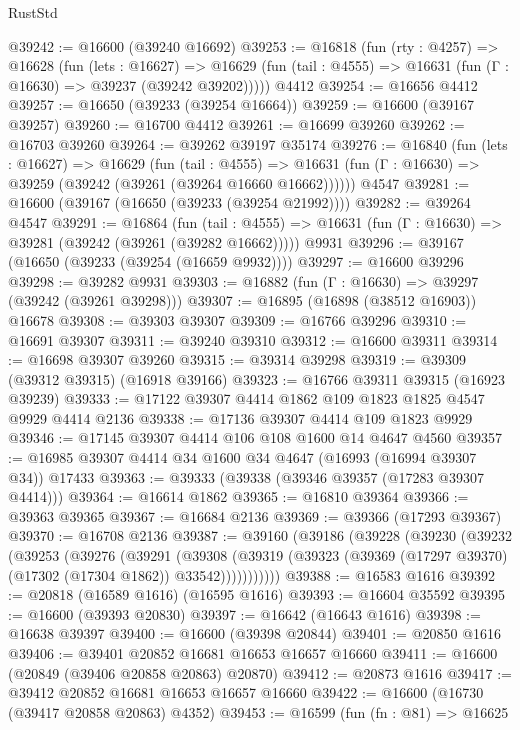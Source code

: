 \begin{lexlean}{RustStd}
\begin{coremodule}
{\begin{coremodule}
{{{{{{{{{{{{{{{{{{{{{{{{{{{{{{{{{{{{{{{{{{{{{{{{{{{{{{{@39242 := @16600 (@39240 @16692)
@39253 := @16818
    (fun (rty : @4257) =>
    @16628
      (fun (lets : @16627) =>
      @16629 (fun (tail : @4555) => @16631 (fun (Γ : @16630) => @39237 (@39242 @39202)))))
    @4412
@39254 := @16656 @4412
@39257 := @16650 (@39233 (@39254 @16664))
@39259 := @16600 (@39167 @39257)
@39260 := @16700 @4412
@39261 := @16699 @39260
@39262 := @16703 @39260
@39264 := @39262 @39197 @35174
@39276 := @16840
    (fun (lets : @16627) =>
    @16629
      (fun (tail : @4555) =>
      @16631 (fun (Γ : @16630) => @39259 (@39242 (@39261 (@39264 @16660 @16662))))))
    @4547
@39281 := @16600 (@39167 (@16650 (@39233 (@39254 @21992))))
@39282 := @39264 @4547
@39291 := @16864
    (fun (tail : @4555) => @16631 (fun (Γ : @16630) => @39281 (@39242 (@39261 (@39282 @16662)))))
    @9931
@39296 := @39167 (@16650 (@39233 (@39254 (@16659 @9932))))
@39297 := @16600 @39296
@39298 := @39282 @9931
@39303 := @16882 (fun (Γ : @16630) => @39297 (@39242 (@39261 @39298)))
@39307 := @16895 (@16898 (@38512 @16903)) @16678
@39308 := @39303 @39307
@39309 := @16766 @39296
@39310 := @16691 @39307
@39311 := @39240 @39310
@39312 := @16600 @39311
@39314 := @16698 @39307 @39260
@39315 := @39314 @39298
@39319 := @39309 (@39312 @39315) (@16918 @39166)
@39323 := @16766 @39311 @39315 (@16923 @39239)
@39333 := @17122 @39307 @4414 @1862 @109 @1823 @1825 @4547 @9929 @4414 @2136
@39338 := @17136 @39307 @4414 @109 @1823 @9929
@39346 := @17145 @39307 @4414 @106 @108 @1600 @14 @4647 @4560
@39357 := @16985 @39307 @4414 @34 @1600 @34 @4647 (@16993 (@16994 @39307 @34)) @17433
@39363 := @39333 (@39338 (@39346 @39357 (@17283 @39307 @4414)))
@39364 := @16614 @1862
@39365 := @16810 @39364
@39366 := @39363 @39365
@39367 := @16684 @2136
@39369 := @39366 (@17293 @39367)
@39370 := @16708 @2136
@39387 := @39160
    (@39186
      (@39228
        (@39230
          (@39232
            (@39253
              (@39276
                (@39291
                  (@39308
                    (@39319
                      (@39323 (@39369 (@17297 @39370) (@17302 (@17304 @1862)) @33542)))))))))))
@39388 := @16583 @1616
@39392 := @20818 (@16589 @1616) (@16595 @1616)
@39393 := @16604 @35592
@39395 := @16600 (@39393 @20830)
@39397 := @16642 (@16643 @1616)
@39398 := @16638 @39397
@39400 := @16600 (@39398 @20844)
@39401 := @20850 @1616
@39406 := @39401 @20852 @16681 @16653 @16657 @16660
@39411 := @16600 (@20849 (@39406 @20858 @20863) @20870)
@39412 := @20873 @1616
@39417 := @39412 @20852 @16681 @16653 @16657 @16660
@39422 := @16600 (@16730 (@39417 @20858 @20863) @4352)
@39453 := @16599
    (fun (fn : @81) =>
    @16625
}}}}}}}}}}}}}}}}}}}}}}}}}}}}}}}}}}}}}}}}}}}}}}}}}}}}}}}
\end{coremodule}}
\end{coremodule}
\end{lexlean}

